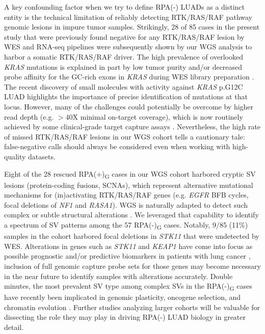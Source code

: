 \documentclass[phd,tocprelim]{cornell}
\begin{document}
A key confounding factor when we try to define RPA(-) LUADs as a distinct entity is the technical limitation of reliably detecting RTK/RAS/RAF pathway genomic lesions in impure tumor samples. Strikingly, 28 of 85 cases in the present study that were previously found negative for any RTK/RAS/RAF lesion by WES and RNA-seq pipelines were subsequently shown by our WGS analysis to harbor a somatic RTK/RAS/RAF driver. The high prevalence of overlooked \textit{KRAS} mutations is explained in part by low tumor purity and/or decreased probe affinity for the GC-rich exons in \textit{KRAS} during WES library preparation \cite{Clark2011-iq}. The recent discovery of small molecules with activity against \textit{KRAS} p.G12C LUAD \cite{Canon2019-aj,Ostrem2013-lt} highlights the importance of precise identification of mutations at that locus. However, many of the challenges could potentially be overcome by higher read depth (e.g. $>$40X minimal on-target coverage), which is now routinely achieved by some clinical-grade target capture assays \cite{Goodman2017-wb,Zehir2017-ue}. Nevertheless, the high rate of missed RTK/RAS/RAF lesions in our WGS cohort tells a cautionary tale: false-negative calls should always be considered even when working with high-quality datasets.

Eight of the 28 rescued RPA(+)\textsubscript{G} cases in our WGS cohort harbored cryptic SV lesions (protein-coding fusions, SCNAs), which represent alternative mutational mechanisms for (in)activating RTK/RAS/RAF genes (e.g. \textit{EGFR} BFB cycles, focal deletions of \textit{NF1} and \textit{RASA1}). WGS is naturally adapted to detect such complex or subtle structural alterations \cite{Hadi2020-um}. We leveraged that capability to identify a spectrum of SV patterns among the 57 RPA(-)\textsubscript{G} cases. Notably, 9/85 (11\%) samples in the cohort harbored focal deletions in \textit{STK11} that were undetected by WES. Alterations in genes such as \textit{STK11} and \textit{KEAP1} have come into focus as possible prognostic and/or predictive biomarkers in patients with lung cancer \cite{Arbour2018-qg,Skoulidis2018-be}, inclusion of full genomic capture probe sets for those genes may become necessary in the near future to identify samples with alterations accurately. Double minutes, the most prevalent SV type among complex SVs in the RPA(-)\textsubscript{G} cases have recently been implicated in genomic plasticity, oncogene selection, and chromatin evolution \cite{Verhaak2019}. Further studies analyzing larger cohorts will be valuable for dissecting the role they may play in driving RPA(-) LUAD biology in greater detail.
\end{document}
